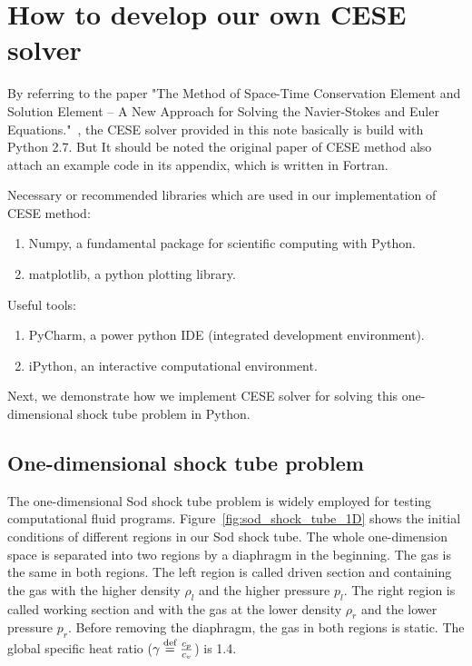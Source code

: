\documentclass[a4paper,12pt,dvips]{article}
\begin{document}
\section{How to develop our own CESE solver}
 \label{sec:development_cese}
By referring to the paper "The Method of Space-Time Conservation Element and 
Solution Element -- A New Approach for Solving the Navier-Stokes and Euler 
Equations."~\cite{CESE_Shin_Chung_Chang_1995}, the CESE solver provided in this 
note basically is build with Python 2.7. But It should be noted the original 
paper of CESE method also attach an example code in its appendix, which is 
written in Fortran. 

Necessary or recommended libraries which are used in our implementation of CESE
method:
 \begin{enumerate}
  \item Numpy, a fundamental package for scientific computing with Python.
  \item matplotlib, a python plotting library.
 \end{enumerate}
Useful tools:
 \begin{enumerate}
  \item PyCharm, a power python IDE (integrated development environment).
  \item iPython, an interactive computational environment.
 \end{enumerate}
Next, we demonstrate how we implement CESE solver for solving this 
one-dimensional shock tube problem in Python.

\subsection{One-dimensional shock tube problem}
 \label{sec:1d_shock_tube}
The one-dimensional Sod shock tube problem is widely employed for testing 
computational fluid programs. Figure~\ref{fig:sod_shock_tube_1D} shows the
initial conditions of different regions in our Sod shock tube. The whole
one-dimension space is separated into two regions by a diaphragm in the
beginning. The gas is the same in both regions. The left region is called
driven section and containing the gas with the higher density $\rho_l$ and
the higher pressure $p_l$. The right region is called working section and
with the gas at the lower density $\rho_r$ and the lower pressure $p_r$.
Before removing the diaphragm, the gas in both regions is static. The global
specific heat ratio ($\gamma\buildrel{\text{def}}\over{=}\frac{c_p}{c_v}$)
is 1.4.
\end{document}
